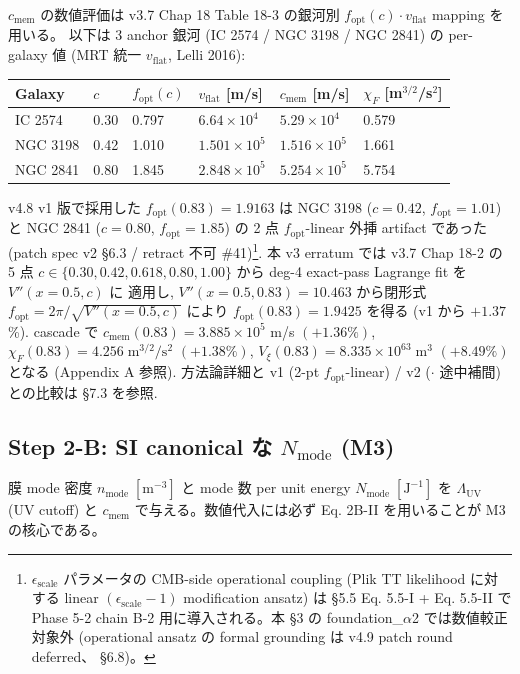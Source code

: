 \documentclass[11pt,a4paper]{ltjsarticle}
\newcommand{\cmem}{c_{\mathrm{mem}}}
\newcommand{\Vxi}{V_{\xi}}
\newcommand{\Nmode}{N_{\mathrm{mode}}}
\newcommand{\nmode}{n_{\mathrm{mode}}}
\newcommand{\Lambdauv}{\Lambda_{\mathrm{UV}}}
\newcommand{\vflat}{v_{\mathrm{flat}}}
\newcommand{\fopt}{f_{\mathrm{opt}}}
\begin{document}
$\cmem$ の数値評価は v3.7 Chap 18 Table 18-3 の銀河別 $\fopt(c) \cdot \vflat$ mapping を用いる。
以下は 3 anchor 銀河 (IC 2574 / NGC 3198 / NGC 2841) の per-galaxy 値 (MRT 統一 $\vflat$, Lelli 2016):

\begin{center}\small
\begin{tabular}{@{}llllll@{}}
\toprule
Galaxy & $c$ & $\fopt(c)$ & $\vflat$ [m/s] & $\cmem$ [m/s] & $\chi_F$ [m$^{3/2}$/s$^2$] \\
\midrule
IC 2574  & 0.30 & 0.797 & $6.64 \times 10^{4}$ & $5.29 \times 10^{4}$ & 0.579 \\
NGC 3198 & 0.42 & 1.010 & $1.501 \times 10^{5}$ & $1.516 \times 10^{5}$ & 1.661 \\
NGC 2841 & 0.80 & 1.845 & $2.848 \times 10^{5}$ & $5.254 \times 10^{5}$ & 5.754 \\
\bottomrule
\end{tabular}
\end{center}

v4.8 v1 版で採用した $\fopt(0.83) = 1.9163$ は NGC 3198 ($c=0.42$, $\fopt=1.01$) と NGC 2841
($c=0.80$, $\fopt=1.85$) の 2 点 $\fopt$-linear 外挿 artifact であった (patch spec v2 \S 6.3 /
retract 不可 \#41)\footnote{$\epsilon_{\mathrm{scale}}$ パラメータの CMB-side operational
coupling (Plik TT likelihood に対する linear $(\epsilon_{\mathrm{scale}}-1)$
modification ansatz) は \S 5.5 Eq. 5.5-I + Eq. 5.5-II で Phase 5-2 chain
B-2 用に導入される。本 \S 3 の foundation\_$\alpha$2 では数値較正対象外
(operational ansatz の formal grounding は v4.9 patch round deferred、
\S 6.8)。}. 本 v3 erratum では v3.7 Chap 18-2 の 5 点
$c \in \{0.30, 0.42, 0.618, 0.80, 1.00\}$ から deg-4 exact-pass Lagrange fit を $V''(x=0.5, c)$ に
適用し, $V''(x=0.5, 0.83) = 10.463$ から閉形式 $\fopt = 2\pi/\sqrt{V''(x=0.5,c)}$ により
$\fopt(0.83) = 1.9425$ を得る (v1 から $+1.37$\%). cascade で
$\cmem(0.83) = 3.885 \times 10^{5}$ m/s $(+1.36\%)$,
$\chi_F(0.83) = 4.256\;\mathrm{m}^{3/2}/\mathrm{s}^2$ $(+1.38\%)$,
$\Vxi(0.83) = 8.335 \times 10^{63}\;\mathrm{m}^3$ $(+8.49\%)$ となる (Appendix A 参照).
方法論詳細と v1 (2-pt $\fopt$-linear) / v2 ($\cdot$ 途中補間) との比較は \S 7.3 を参照.

\subsection{Step 2-B: SI canonical な $\Nmode$ (M3)}
膜 mode 密度 $\nmode\;[\mathrm{m}^{-3}]$ と mode 数 per unit energy $\Nmode\;[\mathrm{J}^{-1}]$ を
$\Lambdauv$ (UV cutoff) と $\cmem$ で与える。数値代入には必ず Eq. 2B-II を用いることが M3 の核心である。
\end{document}

